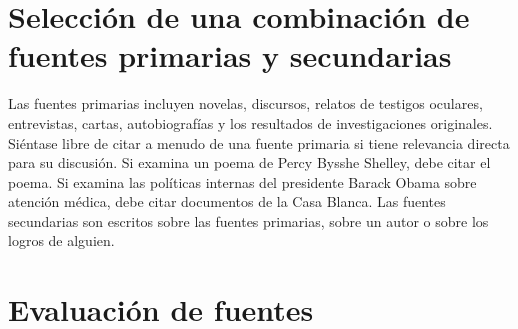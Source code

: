 \section{Selección de una combinación de fuentes primarias y secundarias}
Las fuentes primarias incluyen novelas, discursos, relatos de testigos oculares, entrevistas, cartas, autobiografías y los resultados de investigaciones originales. Siéntase libre de citar a menudo de una fuente primaria si tiene relevancia directa para su discusión. Si examina un poema de Percy Bysshe Shelley, debe citar el poema. Si examina las políticas internas del presidente Barack Obama sobre atención médica, debe citar documentos de la Casa Blanca. Las fuentes secundarias son escritos sobre las fuentes primarias, sobre un autor o sobre los logros de alguien.

\section{Evaluación de fuentes}


